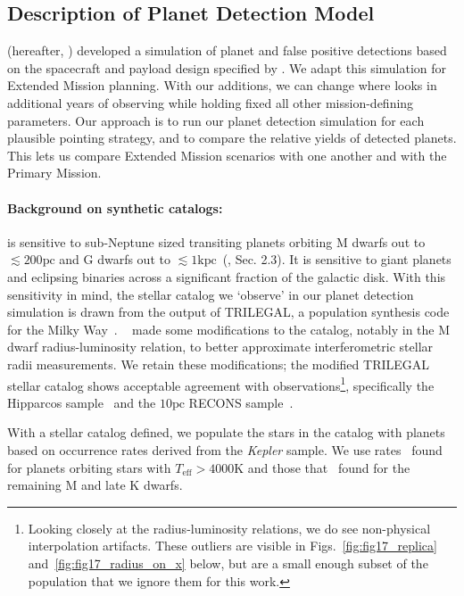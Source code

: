 \subsection{Description of Planet Detection Model}
\label{sec:planet_detection_model}

\citet{Sullivan_2015} (hereafter, )
developed a simulation of \tesss planet and false positive detections
based on the spacecraft and payload design specified by
\citet{ricker_transiting_2014}.  We adapt this simulation for Extended
Mission planning.  With our additions, we can change where \tess looks
in additional years of observing while holding fixed all other
mission-defining parameters.  Our approach is to run our planet
detection simulation for each plausible pointing strategy, and to
compare the relative yields of detected planets.  This lets us compare
Extended Mission scenarios with one another and with the Primary
Mission.

\paragraph{Background on synthetic catalogs:}

\tess is sensitive to sub-Neptune sized transiting planets orbiting M
dwarfs out to $\lesssim200\text{pc}$ and G dwarfs out to
$\lesssim1\text{kpc}$~(, Sec. 2.3).  It is
sensitive to giant planets and eclipsing binaries across a significant
fraction of the galactic disk.  With this sensitivity in mind, the
stellar catalog we `observe' in our planet detection simulation is
drawn from the output of TRILEGAL, a population synthesis code for the
Milky Way~\citep{girardi_star_2005}.  ~ made
some modifications to the catalog, notably in the M dwarf
radius-luminosity relation, to better approximate interferometric
stellar radii measurements.  We retain these modifications; the modified
TRILEGAL stellar catalog shows acceptable agreement with
observations\footnote{Looking closely at the radius-luminosity
  relations, we do see non-physical interpolation artifacts. These
  outliers are visible in Figs.~\ref{fig:fig17_replica}
  and~\ref{fig:fig17_radius_on_x} below, but are a small enough subset
  of the population that we ignore them for this work.}, specifically
the Hipparcos
sample~\citep{perryman_hipparcos_1997,van_leeuwen_validation_2007} and
the $10\text{pc}$ RECONS sample~\citep{henry_solar_2006}.

With a stellar catalog defined, we populate the stars in the catalog
with planets based on occurrence rates derived from the
\textit{Kepler} sample.  We use rates~\citet{fressin_false_2013} found
for planets orbiting stars with $T_\text{eff} > 4000\text{K}$ and
those that~\citet{dressing_occurrence_2015} found for the remaining M
and late K dwarfs.

